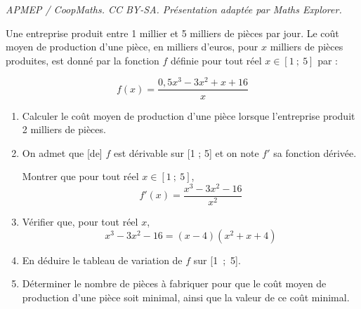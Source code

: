 \documentclass[10pt]{article}
\begin{document}
\noindent\textit{APMEP / CoopMaths. CC BY-SA. Présentation adaptée par Maths Explorer.}\par\medskip
\medskip

Une entreprise produit entre 1 millier et 5 milliers de pièces par jour. Le coût moyen de production d'une pièce, en milliers d'euros, pour $x$ milliers de pièces produites, est donné par la fonction $f$ définie pour tout réel $x\in[1~;~5]$ par :

\[f(x)=\dfrac{0,5x^3-3x^2+x+16}{x}\]

\begin{enumerate}
\item Calculer le coût moyen de production d'une pièce lorsque l'entreprise produit 2 milliers de pièces.
\item On admet que [de] $f$ est dérivable sur [1 ; 5] et on note $f'$ sa fonction dérivée.

 Montrer que pour tout réel $x\in[1~;~5]$, \[f'(x)=\dfrac{x^3-3x^2-16}{x^2}\]
\item Vérifier que, pour tout réel $x$, \[x^3 - 3x^2 - 16 =(x - 4)(x^2 +x + 4)\]
\item En déduire le tableau de variation de $f$ sur [1~;~5].
\item Déterminer le nombre de pièces à fabriquer pour que le coût moyen de production d'une pièce soit minimal, ainsi que la valeur de ce coût minimal.
\end{enumerate}

\vspace{0,5cm}
\end{document}

